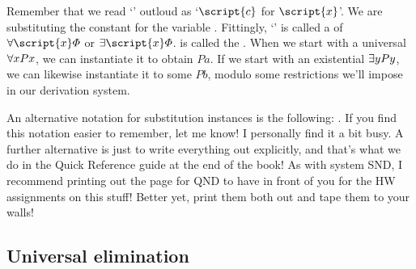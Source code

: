 Remember that we read `' outloud as `$\script{c}$ for $\script{x}$'. We are substituting the constant  for the variable . Fittingly, `\metaA{}' is called a  of $\qt{\forall}{\script{x}}\metaA{}$ or $\qt{\exists}{\script{x}}\metaA{}$.  is called the . When we start with a universal $\forall x Px$, we can instantiate it to obtain $Pa$. If we start with an existential $\exists yPy$, we can likewise instantiate it to some $Pb$, modulo some restrictions we'll impose in our derivation system. 

{\color{black}An alternative notation for substitution instances is the following: \metaA{}\hspace{.15em}. If you find this notation easier to remember, let me know! I personally find it a bit busy. A further alternative is just to write everything out explicitly, and that's what we do in the Quick Reference guide at the end of the book! As with system SND, I recommend printing out the page for QND to have in front of you for the HW assignments on this stuff! Better yet, print them both out and tape them to your walls!} 













\subsection{Universal elimination}

